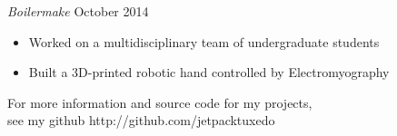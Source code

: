 \documentclass[line,margin]{res}
\newenvironment{tightcenter}{%
  \setlength\topsep{0pt}
  \setlength\parskip{0pt}
  \begin{center}
  }{\end{center}}
\begin{document}
\begin{resume}
    {\sl Boilermake\/} \hfill October 2014
      \begin{itemize}
	\setlength{\itemsep}{-2pt}
        \item Worked on a multidisciplinary team of undergraduate students
        \item Built a 3D-printed robotic hand controlled by Electromyography
      \end{itemize}

\end{resume}

\vfill
\begin{tightcenter}
For more information and source code for my projects,\\
see my github http://github.com/jetpacktuxedo
\end{tightcenter}
\end{document}
